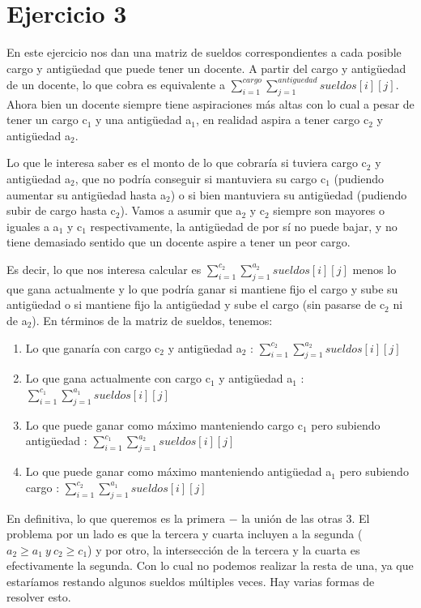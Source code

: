 \section{Ejercicio 3}

En este ejercicio nos dan una matriz de sueldos correspondientes a cada posible cargo y antigüedad que puede tener un docente. A partir del cargo y antigüedad de un docente, lo que cobra es equivalente a $\sum_{i = 1}^{cargo} \sum_{j = 1}^{antiguedad} sueldos[i][j]$. Ahora bien un docente siempre tiene aspiraciones más altas con lo cual a pesar de tener un cargo c$_1$ y una antigüedad a$_1$, en realidad aspira a tener cargo c$_2$ y antigüedad a$_2$. \newline

Lo que le interesa saber es el monto de lo que cobraría si tuviera cargo c$_2$ y antigüedad a$_2$, que no podría conseguir si mantuviera su cargo c$_1$ (pudiendo aumentar su antigüedad hasta a$_2$) o si bien mantuviera su antigüedad (pudiendo subir de cargo hasta c$_2$). Vamos a asumir que a$_2$ y c$_2$ siempre son mayores o iguales a a$_1$ y c$_1$ respectivamente, la antigüedad de por sí no puede bajar, y no tiene demasiado sentido que un docente aspire a tener un peor cargo. \newline

Es decir, lo que nos interesa calcular es $\sum_{i = 1}^{c_2} \sum_{j = 1}^{a_2} sueldos[i][j]$ menos lo que gana actualmente y lo que podría ganar si mantiene fijo el cargo y sube su antigüedad o si mantiene fijo la antigüedad y sube el cargo (sin pasarse de c$_2$ ni de a$_2$). En términos de la matriz de sueldos, tenemos: 

\begin{enumerate}
	\item Lo que ganaría con cargo c$_2$ y antigüedad a$_2$ : $\sum_{i = 1}^{c_2} \sum_{j = 1}^{a_2} sueldos[i][j]$
	\item Lo que gana actualmente con cargo c$_1$ y antigüedad a$_1$ : $\sum_{i = 1}^{c_1} \sum_{j = 1}^{a_1} sueldos[i][j]$
	\item Lo que puede ganar como máximo manteniendo cargo c$_1$ pero subiendo antigüedad : $\sum_{i = 1}^{c_1} \sum_{j = 1}^{a_2} sueldos[i][j]$
	\item Lo que puede ganar como máximo manteniendo antigüedad a$_1$ pero subiendo cargo : $\sum_{i = 1}^{c_2} \sum_{j = 1}^{a_1} sueldos[i][j]$
\end{enumerate}

En definitiva, lo que queremos es la primera $-$ la unión de las otras 3. El problema por un lado es que la tercera y cuarta incluyen a la segunda ($a_2 \geq a_1\ y\ c_2 \geq c_1$) y por otro, la intersección de la tercera y la cuarta es efectivamente la segunda. Con lo cual no podemos realizar la resta de una, ya que estaríamos restando algunos sueldos múltiples veces. Hay varias formas de resolver esto. \newline

